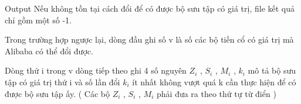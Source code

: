 Output
Nếu không tồn tại cách đổi để có được bộ sưu tập có giá trị, file kết quả chỉ gồm một số -1.

Trong trường hợp ngược lại, dòng đầu ghi số v là số các bộ tiền cổ có giá trị mà Alibaba có thể đổi được.

Dòng thứ i trong v dòng tiếp theo ghi 4 số nguyên $Z_{i}$ , $S_{i}$ , $M_{i}$ , $k_{i}$ mô tả bộ sưu tập có giá trị thứ i và số lần đổi $k_{i}$ ít nhất không vượt quá k cần thực hiện để có được bộ sưu tập ấy. ( Các bộ $Z_{i}$ , $S_{i}$ , $M_{i}$ phải đưa ra theo thứ tự từ điển )